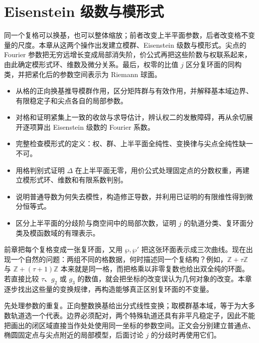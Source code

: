\chapter{Eisenstein 级数与模形式}
\label{b3:ch:23}
\begin{chapterabstract}
同一个复格可以换基，也可以整体缩放；前者改变上半平面参数，后者改变格不变量的尺度。本章从这两个操作出发建立模群、Eisenstein 级数与模形式。尖点的 Fourier 参数把无穷远增长变成局部消失阶，价公式再把这些阶数与权联系起来，由此确定模形式环、维数及微分关系。最后，权零的比值 \(j\) 区分复环面的同构类，并把紧化后的参数空间表示为 Riemann 球面。
\end{chapterabstract}

\begin{learninggoals}
\begin{itemize}
\item 从格的正向换基推导模群作用，区分矩阵群与有效作用，并解释基本域边界、有限稳定子和尖点各自的局部参数。
\item 对格和证明紧集上一致的收敛与求导估计，辨认权二的发散障碍，再从余切展开逐项算出 Eisenstein 级数的 Fourier 系数。
\item 完整检查模形式的定义：权、群、上半平面全纯性、变换律与尖点全纯性缺一不可。
\item 用格判别式证明 \(\Delta\) 在上半平面无零，用价公式处理固定点的分数权重，再建立模形式环、维数和有限系数判别。
\item 说明普通导数为何失去模性，构造修正导数，并利用已证明的有限维性得到微分恒等式。
\item 区分上半平面的分歧阶与商空间中的局部次数，证明 \(j\) 的轨道分类、复环面分类及模函数域的有理表示。
\end{itemize}
\end{learninggoals}

前章把每个复格变成一张复环面，又用 \(\wp,\wp'\) 把这张环面表示成三次曲线。现在出现一个自然的问题：两组不同的格数据，何时描述同一个复结构？例如，\(\mathbb Z+\tau\mathbb Z\) 与 \(\mathbb Z+(\tau+1)\mathbb Z\) 本来就是同一格，而把格乘以非零复数也给出双全纯的环面。若直接比较 \(\tau\)、\(g_2\) 或 \(g_3\) 的数值，就会把坐标的改变误认为几何对象的改变。本章逐步找出这些量的变换规律，再构造能够真正区别复环面的不变量。

\ProseParagraphBreak
{}先处理参数的重复。正向整数换基给出分式线性变换；取模群基本域，等于为大多数轨道选一个代表。边界必须配对，两个特殊轨道还具有非平凡稳定子，因此不能把画出的闭区域直接当作处处使用同一坐标的参数空间。正文会分别建立普通点、椭圆固定点与尖点附近的局部模型，后面讨论 \(j\) 的分歧时再使用它们。

